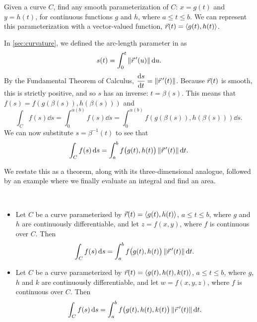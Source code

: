 
Given a curve $C$, find any smooth parameterization of $C$: $x = g(t)$ and $y=h(t)$, for continuous functions $g$ and $h$, where $a\leq t\leq b$. We can represent this parameterization with a vector-valued function, $\vec r(t) =\left\langle g(t),h(t)\right\rangle$.

In \autoref{sec:curvature}, we defined the arc-length parameter in  as 
\[s(t) = \int_0^t \left\lVert \vec r\,'(u) \right\rVert\operatorname{d}\! u.\]
By the Fundamental Theorem of Calculus, $\dfrac{\operatorname{d}\! s}{\operatorname{d}\! t} = \left\lVert \vec r\,'(t) \right\rVert$. Because $\vec r(t)$ is smooth, this is strictly positive, and so $s$ has an inverse: $t=\beta(s)$.  This means that $f(s)=f(g(\beta(s)),h(\beta(s)))$ and
%
\[\int_C f(s)\dd s = \int_0^{\alpha(b)} f(s)\dd s = \int_0^{\alpha(b)}f(g(\beta(s)),h(\beta(s)))\dd s. \]
We can now substitute $s=\beta^{-1}(t)$ to see that
\[\int_C f(s)\operatorname{d}\! s = \int_a^bf\bigl(g(t),h(t)\bigr)\left\lVert \vec r\,'(t) \right\rVert\operatorname{d}\! t.\]

We restate this as a theorem, along with its three-dimensional analogue, followed by an example where we finally evaluate an integral and find an area.

\begin{theorem}\label{thm:line1}%
%
\mbox{}\\[-2\baselineskip]\parbox[t]{\linewidth}{\begin{itemize}
	\item Let $C$ be a curve parameterized by $\vec r(t) =\left\langle g(t),h(t)\right\rangle$, $a\leq t\leq b$, where $g$ and $h$ are continuously differentiable, and let $z=f(x,y)$, where $f$ is continuous over $C$. Then
\[\int_Cf(s)\operatorname{d}\! s = \int_a^bf\bigl(g(t),h(t)\bigr)\left\lVert \vec r\,'(t) \right\rVert\operatorname{d}\! t.\]
	\item Let $C$ be a curve parameterized by $\vec r(t) =\left\langle g(t),h(t),k(t)\right\rangle$, $a\leq t\leq b$, where $g$, $h$ and $k$ are continuously differentiable, and let $w=f(x,y,z)$, where $f$ is continuous over $C$. Then
\[\int_Cf(s)\operatorname{d}\! s = \int_a^bf\bigl(g(t),h(t),k(t)\bigr)\left\lVert \vec r\,'(t) \right\rVert\operatorname{d}\! t.\]
\end{itemize}}
\end{theorem}

